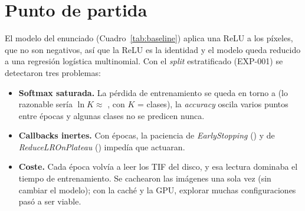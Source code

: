 \section{Punto de partida}
El modelo del enunciado (Cuadro~\ref{tab:baseline}) aplica una ReLU a los píxeles, que no son negativos, así que
la ReLU es la identidad y el modelo queda reducido a una regresión logística multinomial. Con el \emph{split}
estratificado (EXP-001) se detectaron tres problemas:
\begin{itemize}
  \item \textbf{Softmax saturada.} La pérdida de entrenamiento se queda en torno a  (lo
  razonable sería $\ln K \approx$ , con $K$ =  clases), la \emph{accuracy} oscila
  varios puntos entre épocas y algunas clases no se predicen nunca.
  \item \textbf{Callbacks inertes.} Con  épocas, la paciencia de \emph{EarlyStopping}
  () y de \emph{ReduceLROnPlateau} () impedía que actuaran.
  \item \textbf{Coste.} Cada época volvía a leer los TIF del disco, y esa lectura dominaba el tiempo de
  entrenamiento. Se cachearon las imágenes una sola vez (sin cambiar el modelo); con la caché y la GPU, explorar
  muchas configuraciones pasó a ser viable.
\end{itemize}

\begin{table}[h]
  \centering
  \caption{Modelo de partida y sus métricas de validación (EXP-001).}
  \label{tab:baseline}
\end{table}
